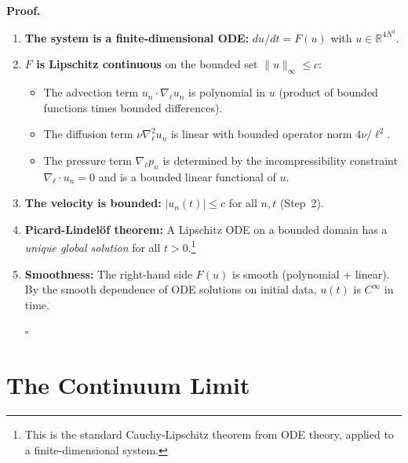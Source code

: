 \medskip\noindent
\textbf{Proof.}
\begin{enumerate}
    \item \textbf{The system is a finite-dimensional ODE:}
    $du/dt = F(u)$ with $u \in \mathbb{R}^{4N^3}$.

    \item \textbf{$F$ is Lipschitz continuous} on the bounded set
    $\|u\|_\infty \le c$:
    \begin{itemize}
        \item The advection term $u_n \cdot \nabla_{\ell} u_n$ is
        polynomial in $u$ (product of bounded functions times
        bounded differences).
        \item The diffusion term $\nu \nabla^2_{\ell} u_n$ is linear
        with bounded operator norm $4\nu/\ell^2$.
        \item The pressure term $\nabla_{\ell} p_n$ is determined by
        the incompressibility constraint $\nabla_{\ell} \cdot u_n = 0$
        and is a bounded linear functional of $u$.
    \end{itemize}

    \item \textbf{The velocity is bounded:}
    $|u_n(t)| \le c$ for all $n, t$ (Step~2).

    \item \textbf{Picard-Lindel\"{o}f theorem:}
    A Lipschitz ODE on a bounded domain has a \textit{unique global
    solution} for all $t > 0$.\footnote{This is the standard Cauchy-Lipschitz
    theorem from ODE theory, applied to a finite-dimensional system.}

    \item \textbf{Smoothness:}
    The right-hand side $F(u)$ is smooth (polynomial + linear).
    By the smooth dependence of ODE solutions on initial data,
    $u(t)$ is $C^\infty$ in time.

    \hfill$\square$
\end{enumerate}

\section{The Continuum Limit}
\label{sec:ns_continuum}

\noindent{}


